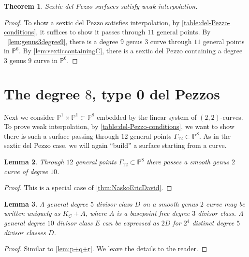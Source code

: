\documentclass[reqno, 11pt]{amsart}
\theoremstyle{definition}
\theoremstyle{remark}
\numberwithin{equation}{section}
\numberwithin{thm}{section}
\numberwithin{prop}{section}
\numberwithin{lem}{section}
\numberwithin{cor}{section}
\numberwithin{conj}{section}
\numberwithin{defn}{section}
\theoremstyle{plain}
\newtheorem{theorem}{Theorem}[section]
\newtheorem{lemma}[theorem]{Lemma}
\theoremstyle{definition}
\newcommand\bp{{\mathbb P}}
\begin{document}
\begin{theorem}\label{thm:sexticDPweakinterpolation}
Sextic del Pezzo surfaces satisfy weak interpolation.
\end{theorem}

\begin{proof}
To show a sextic del Pezzo satisfies interpolation,
by \autoref{table:del-Pezzo-conditions}, it suffices to show it passes through $11$ general points.
By ~\autoref{lem:genus3degree9}, there is a degree $9$ genus $3$
curve through $11$ general points in $\bp^6$. By \autoref{lem:sexticcontainingC},
there is a sextic del Pezzo containing a degree $3$ genus $9$ curve in
$\bp^6$.
\end{proof}



\section{The degree $8$, type 0 del Pezzos}
\label{sec:degree-8-type-0}
Next we consider $\bp^{1} \times \bp^{1} \subset \bp^{8}$ embedded by the linear system of $(2,2)$-curves. To prove weak interpolation, by \autoref{table:del-Pezzo-conditions}, we want to show there is such a surface passing through $12$ general points $\Gamma_{12} \subset \bp^{8}$.  As in the sextic del Pezzo case, we will again ``build'' a surface starting from a curve.

\begin{lemma}\label{lem:genus2degree10}
Through $12$ general points $\Gamma_{12} \subset \bp^{8}$ there passes a smooth genus $2$ curve of degree $10$.
\end{lemma}

\begin{proof}
This is a special case of \autoref{thm:NaskoEricDavid}.
\end{proof}

\begin{lemma}\label{lem:degree10divisors}
A general degree $5$ divisor class $D$ on a smooth genus $2$ curve may be written uniquely as $K_{C} + A$, where $A$ is a basepoint free degree $3$ divisor class.  A general degree $10$ divisor class $E$ can be expressed as $2D$ for $2^{4}$ distinct degree $5$ divisor classes $D$.
\end{lemma}

\begin{proof}
Similar to \autoref{lem:p+q+r}. We leave the details to the reader.
\end{proof}
\end{document}
